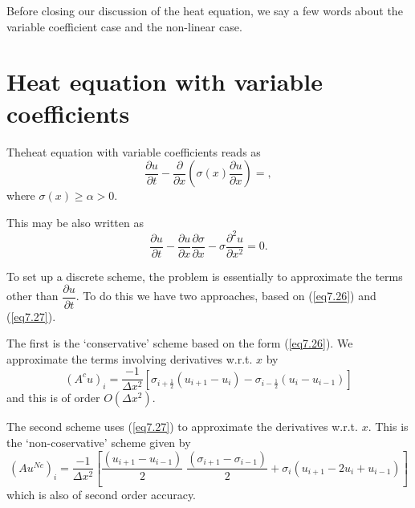 Before closing our discussion of the heat equation, we say a few words about the variable coefficient case and the non-linear case. 

\section{Heat equation with variable coefficients}\label{chap7:sec7.7}

The\pageoriginale  heat equation with variable coefficients reads as
\begin{equation*}
\frac{\partial u}{\partial t} - \frac{\partial }{\partial x} \left(\sigma
(x) \frac{\partial u}{\partial x}\right) = ,\tag{7.26}\label{eq7.26} 
\end{equation*}
where $\sigma (x) \geq \alpha >0$.

This may be also written as
\begin{equation*}
\frac{\partial u}{\partial t} - \frac{\partial u}{\partial x}
\frac{\partial \sigma}{\partial x} - \sigma \frac{\partial^2
  u}{\partial x^2} = 0. \tag{7.27}\label{eq7.27}
\end{equation*}

To set up a discrete scheme, the problem is essentially to approximate
the terms other than $\dfrac{\partial u}{\partial t}$. To do this we
have two approaches, based on (\ref{eq7.26}) and (\ref{eq7.27}). 

The first is the `conservative' scheme based on the form (\ref{eq7.26}). We approximate the terms involving derivatives w.r.t. $x$ by
\begin{equation*}
(A^c u)_i = \frac{-1}{\Delta x^2} \left[\sigma _{i + \frac{1}{2}}  (u_{i+1} - u_i) - \sigma_{i - \frac{1}{2}} (u_i - u_{i-1})\right] 
\tag{7.28}\label{eq7.28}
\end{equation*}
and this is of order $O(\Delta x^2 )$.

The second scheme uses (\ref{eq7.27}) to approximate the derivatives w.r.t. $x$. This is the `non-coservative' scheme given by
\begin{equation*}
(Au^{Nc})_i = \frac{-1}{\Delta x^2} \left[ \frac{(u_{i+1} - u_{i-1})}{2}  \; \frac{(\sigma_{i+1} - \sigma_{i-1})}{2} + \sigma_i (u_{i+1} - 2u_i + u_{i-1})\right] 
\tag{7.29}\label{eq7.29}
\end{equation*}
which is also of second order accuracy.

